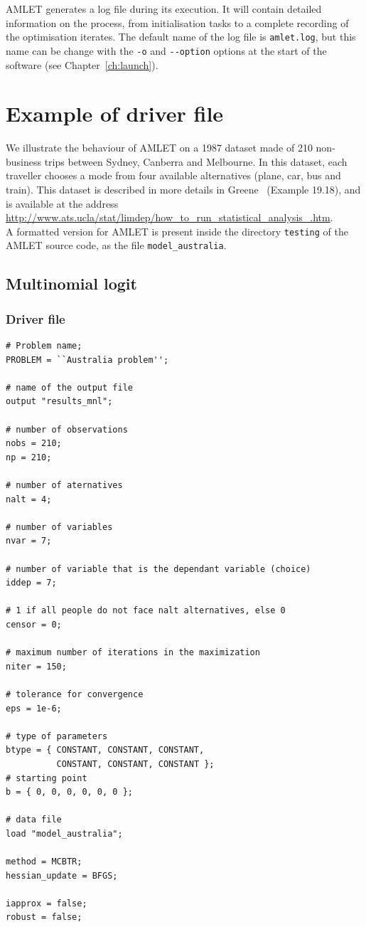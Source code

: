 \documentclass[11pt]{report}
\def\amlet{\textsf{AMLET}}
\begin{document}
\amlet{} generates a log file during its execution.
It will contain detailed information on the process, from
initialisation tasks to a complete recording of the optimisation
iterates.
The default name of the log file is \verb|amlet.log|, but this name
can be change with the \verb|-o| and \verb|--option| options at the
start of the software (see Chapter~\ref{ch:launch}).

\appendix\chapter{Example of driver file}
\label{app:driver}

We illustrate the behaviour of \amlet{} on a 1987 dataset made of 210
non-business trips between Sydney, Canberra and Melbourne. In this
dataset, each traveller chooses a mode from four available
alternatives (plane, car, bus and train). This dataset is described in
more details in Greene~\cite{Gree03} (Example 19.18), and is available
at the address\\
\url{http://www.ats.ucla/stat/limdep/how_to_run_statistical_analysis_.htm}.\\
A formatted version for \amlet{} is present inside the directory
\verb|testing| of the \amlet{} source code, as the file
\verb|model_australia|.

\section{Multinomial logit}

\subsection{Driver file}

\begin{footnotesize}
\begin{verbatim}
# Problem name;
PROBLEM = ``Australia problem'';

# name of the output file
output "results_mnl";

# number of observations
nobs = 210;
np = 210;

# number of aternatives
nalt = 4;

# number of variables
nvar = 7;

# number of variable that is the dependant variable (choice)
iddep = 7;

# 1 if all people do not face nalt alternatives, else 0
censor = 0;

# maximum number of iterations in the maximization
niter = 150;

# tolerance for convergence
eps = 1e-6;

# type of parameters
btype = { CONSTANT, CONSTANT, CONSTANT,
          CONSTANT, CONSTANT, CONSTANT };
# starting point
b = { 0, 0, 0, 0, 0, 0 };

# data file
load "model_australia";

method = MCBTR;
hessian_update = BFGS;

iapprox = false;
robust = false;
\end{verbatim}
\end{footnotesize}
\end{document}
